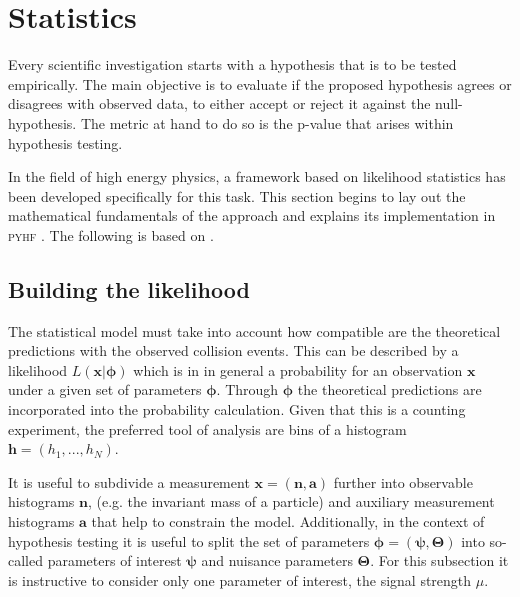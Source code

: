 \section{Statistics}\label{sec:statistics}

Every scientific investigation starts with a hypothesis that is to be tested empirically. The main objective is to evaluate if the proposed hypothesis agrees or disagrees with observed data, to either accept or reject it against the null-hypothesis. The metric at hand to do so is the p-value that arises within hypothesis testing. 

In the field of high energy physics, a framework based on likelihood statistics has been developed specifically for this task. This section begins to lay out the mathematical fundamentals of the approach and explains its implementation in \textsc{pyhf} \citep{pyhf,pyhf_joss}. The following is based on \citep{cowan2011asymptotic,behnke2013data,pyhf}.
 
\subsection{Building the likelihood}\label{sec:likelihood}
The statistical model must take into account how compatible are the theoretical predictions with the observed collision events. This can be described by a likelihood $L(\bm{x} | \bm{\phi})$ which is in in general a probability for an observation $\bm{x}$ under a given set of parameters $\bm{\phi}$. Through $\bm{\phi}$ the theoretical predictions are incorporated into the probability calculation. Given that this is a counting experiment, the preferred tool of analysis are bins of a histogram $\bm{h}=(h_1,...,h_N)$.

It is useful to subdivide a measurement $\bm{x}=(\bm{n},\bm{a})$ further into observable histograms $\bm{n}$, (e.g. the invariant mass of a particle) and auxiliary measurement histograms $\bm{a}$ that help to constrain the model. Additionally, in the context of hypothesis testing it is useful to split the set of parameters $\bm{\phi}=(\bm{\psi},\bm{\Theta})$ into so-called parameters of interest $\bm{\psi}$ and nuisance parameters $\bm{\Theta}$. For this subsection it is instructive to consider only one parameter of interest, the signal strength $\mu$. 


